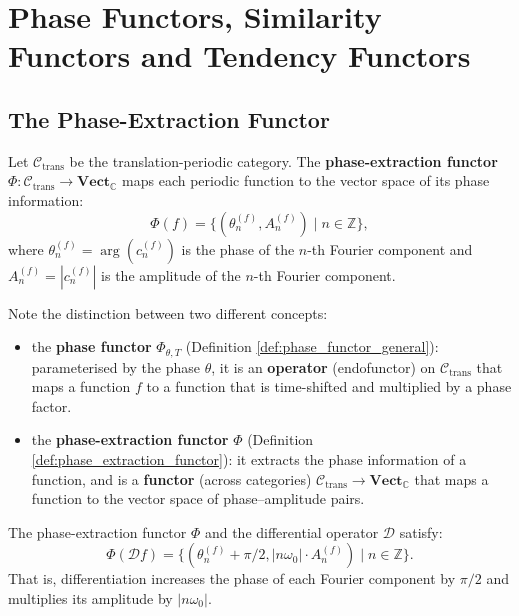 \section{Phase Functors, Similarity Functors and Tendency Functors}\label{sec:phase_similarity_tendency}

\subsection{The Phase-Extraction Functor}

\begin{definition}\label{def:phase_extraction_functor}
Let $\mathcal{C}_{\text{trans}}$ be the translation-periodic category. The \textbf{phase-extraction functor} $\Phi: \mathcal{C}_{\text{trans}} \to \mathbf{Vect}_{\mathbb{C}}$ maps each periodic function to the vector space of its phase information:
\[
\Phi(f) = \{(\theta_n^{(f)}, A_n^{(f)}) \mid n \in \mathbb{Z}\},
\]
where $\theta_n^{(f)} = \arg(c_n^{(f)})$ is the phase of the $n$-th Fourier component and $A_n^{(f)} = |c_n^{(f)}|$ is the amplitude of the $n$-th Fourier component.
\end{definition}

\begin{remark}\label{rem:phase_extraction_vs_phase_functor}
Note the distinction between two different concepts:
\begin{itemize}
    \item the \textbf{phase functor} $\Phi_{\theta, T}$ (Definition \ref{def:phase_functor_general}): parameterised by the phase $\theta$, it is an \textbf{operator} (endofunctor) on $\mathcal{C}_{\text{trans}}$ that maps a function $f$ to a function that is time-shifted and multiplied by a phase factor.
    \item the \textbf{phase-extraction functor} $\Phi$ (Definition \ref{def:phase_extraction_functor}): it extracts the phase information of a function, and is a \textbf{functor} (across categories) $\mathcal{C}_{\text{trans}} \to \mathbf{Vect}_{\mathbb{C}}$ that maps a function to the vector space of phase--amplitude pairs.
\end{itemize}
\end{remark}

\begin{proposition}\label{prop:phase_extraction_differential}
The phase-extraction functor $\Phi$ and the differential operator $\mathcal{D}$ satisfy:
\[
\Phi(\mathcal{D}f) = \{(\theta_n^{(f)} + \pi/2, |n\omega_0| \cdot A_n^{(f)}) \mid n \in \mathbb{Z}\}.
\]
That is, differentiation increases the phase of each Fourier component by $\pi/2$ and multiplies its amplitude by $|n\omega_0|$.
\end{proposition}

